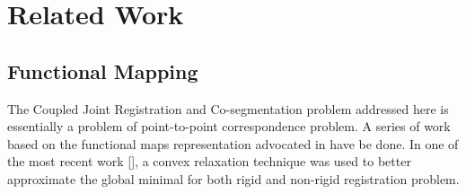 \section{Related Work}
\label{sec:rw}
\subsection{Functional Mapping}
The Coupled Joint Registration and Co-segmentation problem addressed here is essentially a problem of point-to-point correspondence problem. A series of work based on the functional maps representation advocated in \cite{Ovsjanikov2012Functional} have be done. In one of the most recent work [], a convex relaxation technique was used to better approximate the global minimal for both rigid and non-rigid registration problem.   